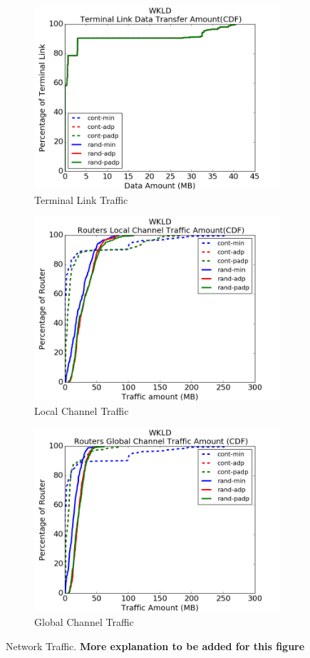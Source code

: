 \documentclass[conference,compsoc]{IEEEtran}
\begin{document}
\begin{figure}[t!]
    \centering
    \begin{subfigure}[t]{0.32\textwidth}
        \centering
        \includegraphics[height=1.8 in]{wkld/tl-traffic}
        \caption{Terminal Link Traffic}
        \label{fig:terminal-link-traffic}
    \end{subfigure}%
    \hspace{1em}%
    \begin{subfigure}[t]{0.32\textwidth}
        \centering
        \includegraphics[height=1.8 in]{wkld/lc-traffic}
        \caption{Local Channel Traffic}
        \label{fig:local-channel-traffic}
    \end{subfigure}%
    \begin{subfigure}[t]{0.32\textwidth}
        \centering
        \includegraphics[height=1.8 in]{wkld/gc-traffic}
        \caption{Global Channel Traffic}
        \label{fig:global-channel-traffic}
    \end{subfigure}%
   \caption{Network Traffic. \textbf{More explanation to be added for this figure}}
   \label{fig:wkld-network-traffic}
\end{figure}
\end{document}

